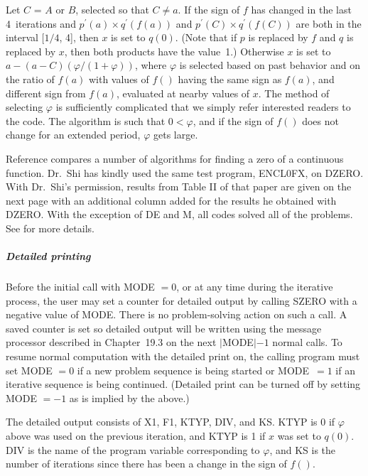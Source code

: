 \documentclass[twoside]{MATH77}
\begin{document}
Let $C$ = $A$ or $B$, selected so that $C \neq a$. If the sign of $f$ has
changed in the last 4~iterations and $p^{\prime}(a)\times q^{\prime}(f(a))$
and $p^{\prime}(C)\times q^{\prime}(f(C))$ are both in the interval $[1/4$,
4], then $x$ is set to $q(0)$. (Note that if $p$ is replaced by $f$ and $q$
is replaced by $x$, then both products have the value~1.) Otherwise $x$ is
set to $a - (a - C)(\varphi /(1+\varphi ))$, where $%
\varphi $ is selected based on past behavior and on the ratio of $f(a)$ with
values of $f()$ having the same sign as $f(a)$, and different sign from $f(a)
$, evaluated at nearby values of $x$. The method of selecting $\varphi $ is
sufficiently complicated that we simply refer interested readers to the
code. The algorithm is such that $0 < \varphi $, and if the sign of $f()$ does
not change for an extended period, $\varphi $ gets large.

Reference \cite{Alefeld:1995:AEZ} compares a number of algorithms for
finding a zero of a continuous function.  Dr.\ Shi has kindly used the
same test program, ENCL0FX, on DZERO.  With Dr.\ Shi's permission, results
from Table II of that paper are given on the next page with an additional
column added for the results he obtained with DZERO.  With the exception
of DE and M, all codes solved all of the problems.  See  for more
details.

\subparagraph{Detailed printing}

Before the initial call with MODE $= 0$, or at any time during the
iterative process, the user may set a counter for detailed output by
calling SZERO with a negative value of MODE.  There is no problem-solving
action on such a call.  A saved counter is set so detailed output will be
written using the message processor described in Chapter~19.3 on the next
$|$MODE$|-1$ normal calls.  To resume normal computation with the detailed
print on, the calling program must set MODE $= 0$ if a new problem
sequence is being started or MODE\ $= 1$ if an iterative sequence is being
continued.  (Detailed print can be turned off by setting MODE $= -1$ as is
implied by the above.)

The detailed output consists of X1, F1, KTYP, DIV, and KS. KTYP is 0 if $\varphi $
above was used on the previous iteration, and KTYP is 1 if $x$ was set to $%
q(0)$. DIV is the name of the program variable corresponding to $\varphi $, and
KS is the number of iterations since there has been a change in the sign of $%
f().$



\end{document}
